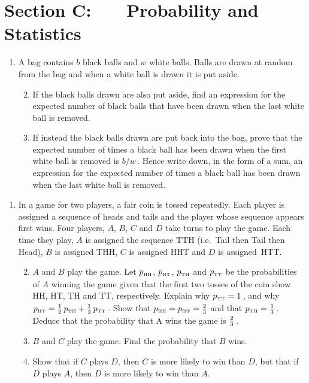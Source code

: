 \documentclass[a4, 11pt]{report}
\newlength{\qspace}
\newcounter{qnumber}
\newenvironment{question}%
 {\vspace{\qspace}
  \begin{enumerate}[\bfseries 1\quad][10]%
    \setcounter{enumi}{\value{qnumber}}%
    \item%
 }
{
  \end{enumerate}
  \filbreak
  \stepcounter{qnumber}
 }
\newenvironment{questionparts}[1][1]%
 {
  \begin{enumerate}[\bfseries (i)]%
    \setcounter{enumii}{#1}
    \addtocounter{enumii}{-1}
    \setlength{\itemsep}{5mm}
    \setlength{\parskip}{8pt}
 }
 {
  \end{enumerate}
 }
\begin{document}
	
	\newpage
\section*{Section C: \ \ \ Probability and Statistics}


\begin{question}
A bag contains $b$ black balls and $w$ white balls. Balls are drawn
at random from the bag and when a white ball is drawn it is put aside.
\begin{questionparts}
\item If the black balls drawn are also put aside, find an
expression for the expected number of black balls that have been drawn
when the last white ball is removed.
\item  If instead the black balls drawn are put back  into the bag,
prove that the expected number of times a black ball has been drawn when
the first  white ball is removed is $b/w\,$. Hence write down, in the form of
a sum,  an expression for the expected number of times a black ball has been drawn when
the last  white ball is removed.

\end{questionparts}
\end{question}

\begin{question}
In a  game for two players,  a fair coin is tossed repeatedly. Each player 
is assigned a sequence of heads and tails and the player whose sequence appears first wins.
Four players, $A$, $B$, $C$ and $D$ take turns to play the game. 
Each time they play, $A$ is assigned the sequence
TTH (i.e.~Tail then Tail then Head),  $B$ is  assigned  THH,
$C$ is assigned HHT and $D$ is assigned~HTT.

\begin{questionparts}
\item
$A$ and $B$ play the   game. 
Let 
$p_{\mathstrut\mbox{\tiny HH}}$, 
$p_{\mathstrut\mbox{\tiny HT}}$, 
$p_{\mathstrut\mbox{\tiny TH}}$ and 
$p_{\mathstrut\mbox{\tiny TT}}$ 
be the probabilities of $A$ winning the
game  given that the first two tosses of the coin show HH,  HT, TH and TT, respectively.
Explain why 
$p_{\mathstrut\mbox{\tiny TT}} = 1\,$, 
and why 
$p_{\mathstrut\mbox{\tiny HT}} = {1 \over 2} \,
p_{\mathstrut\mbox{\tiny TH}} + 
{1\over 2} \,
p_{\mathstrut\mbox{\tiny TT}}\,$.
Show that 
$p_{\mathstrut\mbox{\tiny HH}} = 
p_{\mathstrut\mbox{\tiny HT}} 
= {2 \over 3}$ 
and that 
$p_{\mathstrut\mbox{\tiny TH}} = {1\over 3}\,$. 
Deduce that the probability that A wins the game is ${2\over 3}\,$.

\item $B$ and $C$ play the game.
Find the probability that  $B$ wins.

\item Show that if $C$ plays $D$, then  $C$ is more likely to win than $D$, 
but that if $D$ plays $A$, then $D$ is more likely to win than $A$.

\end{questionparts}
\end{question}
\end{document}
